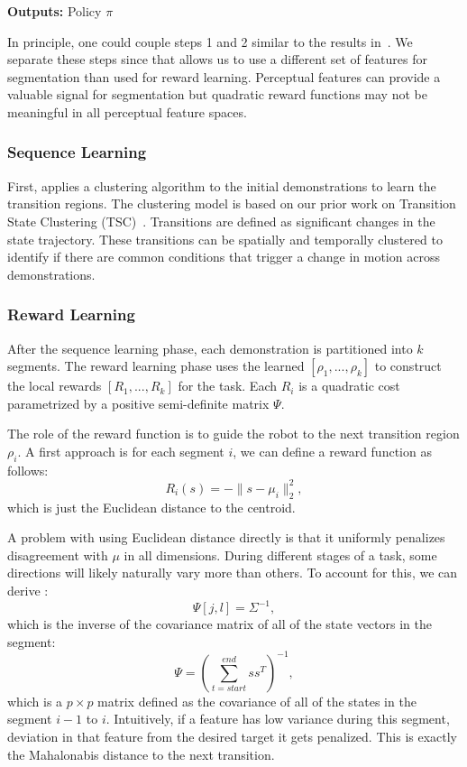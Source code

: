 \noindent\textbf{Outputs:} Policy $\pi$

\vspace{4pt}

In principle, one could couple steps 1 and 2 similar to the results in~\cite{ranchod2015nonparametric}. We separate these steps since that allows us to use a different set of features for segmentation than used for reward learning. Perceptual features can provide a valuable signal for segmentation but quadratic reward functions may not be meaningful in all perceptual feature spaces. 

\subsubsection{Sequence Learning}
First, \hirl applies a clustering algorithm to the initial demonstrations to learn the transition regions. The clustering model is based on our prior work on Transition State Clustering (TSC)~\cite{krishnan2015tsc,murali2016}. Transitions are defined as significant changes in the state trajectory. These transitions can be spatially and temporally clustered to identify if there are common conditions that trigger a change in motion across demonstrations.

\subsubsection{Reward Learning}\label{sec:reward}
After the sequence learning phase, each demonstration is partitioned into $k$ segments.
The reward learning phase uses the learned $[\rho_1,...,\rho_k]$ to construct the local rewards $[R_1,...,R_k]$ for the task.
Each $R_i$ is a quadratic cost parametrized by a positive semi-definite matrix $\Psi$.


The role of the reward function is to guide the robot to the next transition region $\rho_i$.
A first approach is for each segment $i$, we can define a reward function as follows:
\[
R_i(s) = -\|s - \mu_{i}\|_2^2, 
\]
which is just the Euclidean distance to the centroid.

A problem with using Euclidean distance directly is that it uniformly penalizes disagreement with $\mu$ in all dimensions.
During different stages of a task, some directions will likely naturally vary more than others.
To account for this, we can derive :
\[
\Psi[j,l] = \Sigma^{-1},
\]
which is the inverse of the covariance matrix of all of the state vectors in the segment:
\begin{equation}
\Psi = (\sum_{t=start}^{end} s s^T)^{-1},
\label{localq}
\end{equation}
which is a $p \times p$ matrix defined as the covariance of all of the states in the segment $i-1$ to $i$.
Intuitively, if a feature has low variance during this segment, deviation in that feature from the desired target it gets penalized. 
This is exactly the Mahalonabis distance to the next transition. 

